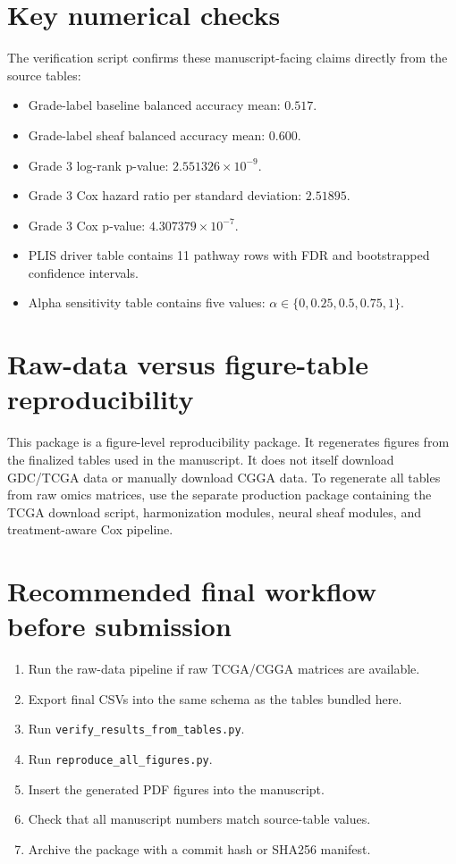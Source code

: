 \documentclass[11pt]{article}
\begin{document}
\section{Key numerical checks}
The verification script confirms these manuscript-facing claims directly from the source tables:
\begin{itemize}[leftmargin=1.2cm]
  \item Grade-label baseline balanced accuracy mean: $0.517$.
  \item Grade-label sheaf balanced accuracy mean: $0.600$.
  \item Grade 3 log-rank p-value: $2.551326\times 10^{-9}$.
  \item Grade 3 Cox hazard ratio per standard deviation: $2.51895$.
  \item Grade 3 Cox p-value: $4.307379\times 10^{-7}$.
  \item PLIS driver table contains 11 pathway rows with FDR and bootstrapped confidence intervals.
  \item Alpha sensitivity table contains five values: $\alpha\in\{0,0.25,0.5,0.75,1\}$.
\end{itemize}

\section{Raw-data versus figure-table reproducibility}
This package is a figure-level reproducibility package. It regenerates figures from the finalized tables used in the manuscript. It does not itself download GDC/TCGA data or manually download CGGA data. To regenerate all tables from raw omics matrices, use the separate production package containing the TCGA download script, harmonization modules, neural sheaf modules, and treatment-aware Cox pipeline.

\section{Recommended final workflow before submission}
\begin{enumerate}[leftmargin=1.2cm]
  \item Run the raw-data pipeline if raw TCGA/CGGA matrices are available.
  \item Export final CSVs into the same schema as the tables bundled here.
  \item Run \texttt{verify\_results\_from\_tables.py}.
  \item Run \texttt{reproduce\_all\_figures.py}.
  \item Insert the generated PDF figures into the manuscript.
  \item Check that all manuscript numbers match source-table values.
  \item Archive the package with a commit hash or SHA256 manifest.
\end{enumerate}
\end{document}

